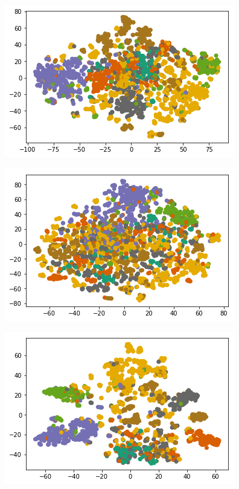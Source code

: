 \documentclass[12pt,twoside]{report}
\begin{document}
\begin{center}
\begin{minipage}{0.45\linewidth}
\includegraphics[width=\linewidth]{figures/cora/node2vec_true.png}
\end{minipage}
\hfill
\begin{minipage}{0.45\linewidth}
\includegraphics[width=\linewidth]{figures/cora/dyngem_true.png}
\end{minipage}%
\hfill
\begin{minipage}{0.45\linewidth}
\includegraphics[width=\linewidth]{figures/cora/true_our_model.png}

\end{minipage}
\end{center}
\end{document}
